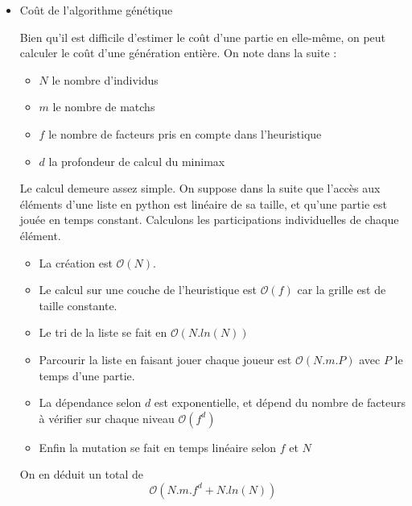 \documentclass[10pt]{article}
\begin{document}
\begin{enumerate}
\begin{itemize}
\item Coût de l'algorithme génétique
\par Bien qu'il est difficile d'estimer le coût d'une partie en elle-même, on peut calculer le coût d'une génération entière.
On note dans la suite : 
\begin{itemize}
\item $N$ le nombre d'individus
\item $m$ le nombre de matchs
\item $f$ le nombre de facteurs pris en compte dans l'heuristique
\item $d$ la profondeur de calcul du minimax
\end{itemize}
Le calcul demeure assez simple. On suppose dans la suite que l'accès aux éléments d'une liste en python est linéaire de sa taille, et qu'une partie est jouée en temps constant. Calculons les participations individuelles de chaque élément.
\begin{itemize}
\item La création est $\mathcal{O}(N)$.
\item Le calcul sur une couche de l'heuristique est $\mathcal{O}(f)$ car la grille est de taille constante.
\item Le tri de la liste se fait en $\mathcal{O}(N.ln(N))$
\item Parcourir la liste en faisant jouer chaque joueur est $\mathcal{O}(N.m.P)$ avec $P$ le temps d'une partie.
\item La dépendance selon $d$ est exponentielle, et dépend du nombre de facteurs à vérifier sur chaque niveau $\mathcal{O}(f^d)$
\item Enfin la mutation se fait en temps linéaire selon $f$ et $N$
\end{itemize}
\par On en déduit un total de $$\boxed{\mathcal{O}(N.m.f^d+N.ln(N))}$$ 
\end{itemize}







\end{enumerate}
\end{document}
